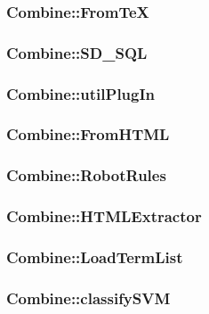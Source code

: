 \subsubsection{Combine::FromTeX}

\htmlrule\hrulefill
\subsubsection{Combine::SD\_SQL}

\htmlrule\hrulefill
\subsubsection{Combine::utilPlugIn}

\htmlrule\hrulefill
\subsubsection{Combine::FromHTML}

\htmlrule\hrulefill
\subsubsection{Combine::RobotRules}

\htmlrule\hrulefill
\subsubsection{Combine::HTMLExtractor}

\htmlrule\hrulefill
\subsubsection{Combine::LoadTermList}

\htmlrule\hrulefill
\subsubsection{Combine::classifySVM}

\htmlrule\hrulefill
